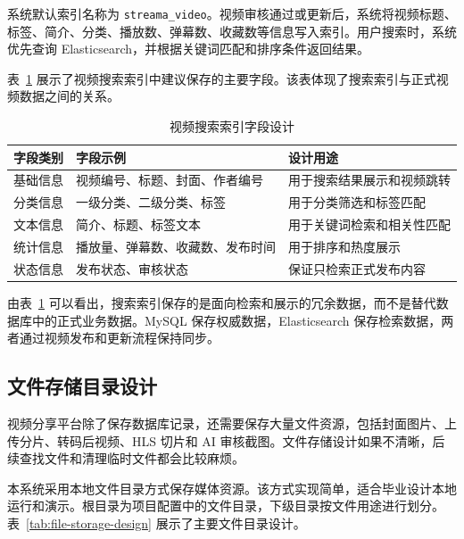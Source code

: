 系统默认索引名称为 \texttt{streama\_video}。视频审核通过或更新后，系统将视频标题、标签、简介、分类、播放数、弹幕数、收藏数等信息写入索引。用户搜索时，系统优先查询 Elasticsearch，并根据关键词匹配和排序条件返回结果。

表~\ref{tab:search-index-fields} 展示了视频搜索索引中建议保存的主要字段。该表体现了搜索索引与正式视频数据之间的关系。

\begin{table}[htbp]
  \centering
  \caption{视频搜索索引字段设计}
  \label{tab:search-index-fields}
  \begin{tabular}{p{}p{}p{}}
    \hline
    \textbf{字段类别} & \textbf{字段示例} & \textbf{设计用途} \\
    \hline
    基础信息 & 视频编号、标题、封面、作者编号 & 用于搜索结果展示和视频跳转 \\
    分类信息 & 一级分类、二级分类、标签 & 用于分类筛选和标签匹配 \\
    文本信息 & 简介、标题、标签文本 & 用于关键词检索和相关性匹配 \\
    统计信息 & 播放量、弹幕数、收藏数、发布时间 & 用于排序和热度展示 \\
    状态信息 & 发布状态、审核状态 & 保证只检索正式发布内容 \\
    \hline
  \end{tabular}
\end{table}

由表~\ref{tab:search-index-fields} 可以看出，搜索索引保存的是面向检索和展示的冗余数据，而不是替代数据库中的正式业务数据。MySQL 保存权威数据，Elasticsearch 保存检索数据，两者通过视频发布和更新流程保持同步。

\subsection{文件存储目录设计}
\label{subsec:file-storage-design}

视频分享平台除了保存数据库记录，还需要保存大量文件资源，包括封面图片、上传分片、转码后视频、HLS 切片和 AI 审核截图。文件存储设计如果不清晰，后续查找文件和清理临时文件都会比较麻烦。

本系统采用本地文件目录方式保存媒体资源。该方式实现简单，适合毕业设计本地运行和演示。根目录为项目配置中的文件目录，下级目录按文件用途进行划分。表~\ref{tab:file-storage-design} 展示了主要文件目录设计。

